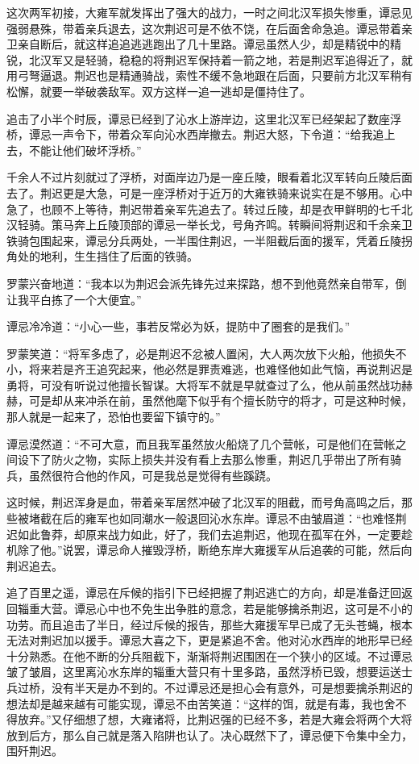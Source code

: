 这次两军初接，大雍军就发挥出了强大的战力，一时之间北汉军损失惨重，谭忌见强弱悬殊，带着亲兵退去，这次荆迟可是不依不饶，在后面舍命急追。谭忌带着亲卫亲自断后，就这样追追逃逃跑出了几十里路。谭忌虽然人少，却是精锐中的精锐，北汉军又是轻骑，稳稳的将荆迟军保持着一箭之地，若是荆迟军追得近了，就用弓弩逼退。荆迟也是精通骑战，索性不缓不急地跟在后面，只要前方北汉军稍有松懈，就要一举破袭敌军。双方这样一追一逃却是僵持住了。

追击了小半个时辰，谭忌已经到了沁水上游岸边，这里北汉军已经架起了数座浮桥，谭忌一声令下，带着众军向沁水西岸撤去。荆迟大怒，下令道：“给我追上去，不能让他们破坏浮桥。”

千余人不过片刻就过了浮桥，对面岸边乃是一座丘陵，眼看着北汉军转向丘陵后面去了。荆迟更是大急，可是一座浮桥对于近万的大雍铁骑来说实在是不够用。心中急了，也顾不上等待，荆迟带着亲军先追去了。转过丘陵，却是衣甲鲜明的七千北汉轻骑。策马奔上丘陵顶部的谭忌一举长戈，号角齐鸣。转瞬间将荆迟和千余亲卫铁骑包围起来，谭忌分兵两处，一半围住荆迟，一半阻截后面的援军，凭着丘陵拐角处的地利，生生挡住了后面的铁骑。

罗蒙兴奋地道：“我本以为荆迟会派先锋先过来探路，想不到他竟然亲自带军，倒让我平白拣了一个大便宜。”

谭忌冷冷道：“小心一些，事若反常必为妖，提防中了圈套的是我们。”

罗蒙笑道：“将军多虑了，必是荆迟不忿被人置闲，大人两次放下火船，他损失不小，将来若是齐王追究起来，他必然是罪责难逃，也难怪他如此气恼，再说荆迟是勇将，可没有听说过他擅长智谋。大将军不就是早就查过了么，他从前虽然战功赫赫，可是却从来冲杀在前，虽然他麾下似乎有个擅长防守的将才，可是这种时候，那人就是一起来了，恐怕也要留下镇守的。”

谭忌漠然道：“不可大意，而且我军虽然放火船烧了几个营帐，可是他们在营帐之间设下了防火之物，实际上损失并没有看上去那么惨重，荆迟几乎带出了所有骑兵，虽然很符合他的作风，可是我总是觉得有些蹊跷。

这时候，荆迟浑身是血，带着亲军居然冲破了北汉军的阻截，而号角高鸣之后，那些被堵截在后的雍军也如同潮水一般退回沁水东岸。谭忌不由皱眉道：“也难怪荆迟如此鲁莽，却原来战力如此，好了，我们去追荆迟，他现在孤军在外，一定要趁机除了他。”说罢，谭忌命人摧毁浮桥，断绝东岸大雍援军从后追袭的可能，然后向荆迟追去。

追了百里之遥，谭忌在斥候的指引下已经把握了荆迟逃亡的方向，却是准备迂回返回辎重大营。谭忌心中也不免生出争胜的意念，若是能够擒杀荆迟，这可是不小的功劳。而且追击了半日，经过斥候的报告，那些大雍援军早已成了无头苍蝇，根本无法对荆迟加以援手。谭忌大喜之下，更是紧追不舍。他对沁水西岸的地形早已经十分熟悉。在他不断的分兵阻截下，渐渐将荆迟围困在一个狭小的区域。不过谭忌皱了皱眉，这里离沁水东岸的辎重大营只有十里多路，虽然浮桥已毁，想要运送士兵过桥，没有半天是办不到的。不过谭忌还是担心会有意外，可是想要擒杀荆迟的想法却是越来越有可能实现，谭忌不由苦笑道：“这样的饵，就是有毒，我也舍不得放弃。”又仔细想了想，大雍诸将，比荆迟强的已经不多，若是大雍会将两个大将放到后方，那么自己就是落入陷阱也认了。决心既然下了，谭忌便下令集中全力，围歼荆迟。

